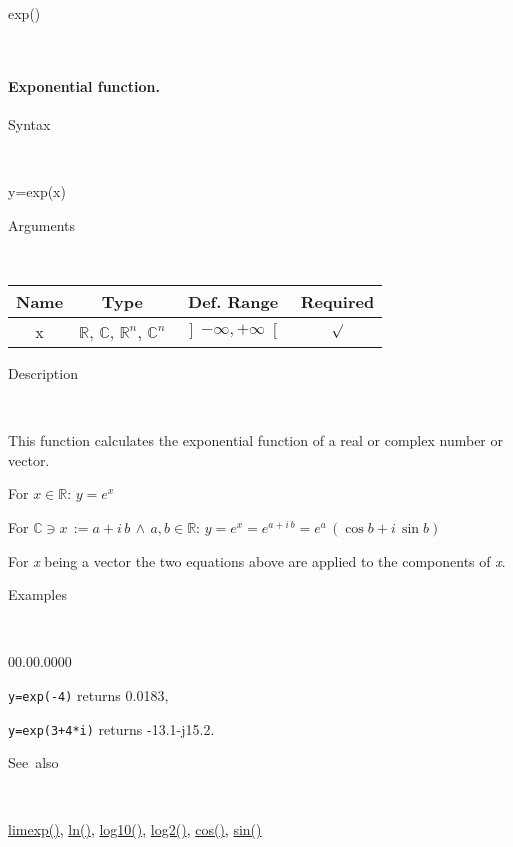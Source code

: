 \newpage
{}

\begin{description}
\item [\hypertarget{exp}{}{\Large exp()}]~{\Large \par}
\end{description}

\paragraph{\label{par:Exponential-function}Exponential function.}

\begin{description}
\item [Syntax]~
\end{description}
y=exp(x)

\begin{description}
\item [Arguments]~
\end{description}
\begin{tabular}{|c|c|c|c|}
\hline 
Name&
Type&
Def. Range&
Required\tabularnewline
\hline
\hline 
x&
$\mathbb{R}$, $\mathbb{C}$, $\mathbb{R}^{n}$, $\mathbb{C}^{n}$&
$\left]-\infty,+\infty\right[$&
$\surd$\tabularnewline
\hline
\end{tabular}

\begin{description}
\item [Description]~
\end{description}
This function calculates the exponential function of a real or complex
number or vector.

\medskip{}
For $x\in\mathbb{R}$: $y=e^{x}$ 
\medskip{}

For $\mathbb{\mathbb{C}}\ni x\,:=a+i\, b\,\wedge\, a,b\in\mathbb{R}$:
$y=e^{x}=e^{a+i\, b}=e^{a}\,\left(\cos b+i\,\sin b\right)$
\medskip{}

For \textit{x} being a vector the two equations above are
applied to the components of \textit{x}.

\begin{description}
\item [Examples]~
\end{description}
\begin{lyxlist}{00.00.0000}
\item [\texttt{y=exp(-4)}]returns 0.0183,
\item [\texttt{y=exp(3+4{*}i)}]returns -13.1-j15.2.
\end{lyxlist}
\begin{description}
\item [See~also]~
\end{description}
\textcolor{blue}{\hyperlink{limexp}{limexp()}}\textcolor{black}{,}
\textcolor{blue}{\hyperlink{ln}{ln()}}\textcolor{black}{,} \textcolor{blue}{\hyperlink{log10}{log10()}}\textcolor{black}{,}
\textcolor{blue}{\hyperlink{log2}{log2()}}\textcolor{black}{,} \textcolor{blue}{\hyperlink{cos}{cos()}}\textcolor{black}{,}
\textcolor{blue}{\hyperlink{sin}{sin()}}



